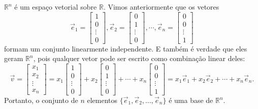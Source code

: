 \begin{ex}
	$\mathbb{R}^n$ é um espaço vetorial sobre $\mathbb{R}$. Vimos anteriormente que os vetores
	\begin{equation}
	\vec{e}_1 =
	\left[
	\begin{array}{c}
	1 \\
	0 \\
	\vdots \\
	0
	\end{array}
	\right], \vec{e}_2 =
	\left[
	\begin{array}{c}
	0 \\
	1 \\
	\vdots \\
	0
	\end{array}
	\right], \cdots, \vec{e}_n =
	\left[
	\begin{array}{c}
	0 \\
	0 \\
	\vdots \\
	1
	\end{array}
	\right]
	\end{equation} formam um conjunto linearmente independente. E também é verdade que eles geram $\mathbb{R}^n$, pois qualquer vetor pode ser escrito como combinação linear deles:
	\begin{equation}
	\vec{v} =
	\left[
	\begin{array}{c}
	x_1 \\
	x_2 \\
	\vdots \\
	x_n
	\end{array}
	\right] = x_1
	\left[
	\begin{array}{c}
	1 \\
	0 \\
	\vdots \\
	0
	\end{array}
	\right] + x_2
	\left[
	\begin{array}{c}
	0 \\
	1 \\
	\vdots \\
	0
	\end{array}
	\right] + \cdots + x_n
	\left[
	\begin{array}{c}
	0 \\
	0 \\
	\vdots \\
	1
	\end{array}
	\right] = x_1 \vec{e}_1 + x_2 \vec{e}_2 + \cdots + x_n \vec{e}_n.
	\end{equation} Portanto, o conjunto de $n$ elementos $\{\vec{e}_1, \vec{e}_2, \dots, \vec{e}_n\}$ é uma base de $\mathbb{R}^n$.
\end{ex}



